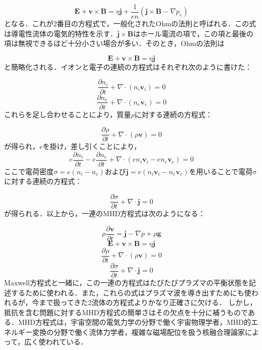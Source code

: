 \documentclass{ltjsarticle}
\numberwithin{equation}{section} %
\begin{document}
\begin{equation}
  \bm{E} + \bm{v} \times \bm{B} = \eta \bm{j} + \frac{1}{en}(\bm{j}\times \bm{B} - \nabla p_e) \label{5.90}
\end{equation}
となる．これが2番目の方程式で，一般化されたOhmの法則と呼ばれる．この式は導電性流体の電気的特性を示す．$\bm{j}\times \bm{B}$はホール電流の項で，この項と最後の項は無視できるほど十分小さい場合が多い．そのとき，Ohmの法則は

\begin{equation}
  \bm{E} + \bm{v}\times \bm{B} = \eta \bm{j} \label{5.91}
\end{equation}
と簡略化される．イオンと電子の連続の方程式はそれぞれ次のように書けた：

\[
  \frac{\partial n_i}{\partial t} + \nabla \cdot (n_i\bm{v}_i) =0
\]
\[
  \frac{\partial n_e}{\partial t} + \nabla \cdot (n_e\bm{v}_e) =0
\]
これらを足し合わせることにより，質量$\rho$に対する連続の方程式：

\[
  \frac{\partial \rho}{\partial t} + \nabla \cdot (\rho \bm{v}) = 0
\]
が得られ，$e$を掛け，差し引くことにより，
\[
  e\frac{\partial n_i}{\partial t} - e\frac{\partial n_e}{\partial t} + \nabla \cdot (en_i\bm{v}_i - en_e\bm{v}_e) = 0
\]
ここで電荷密度$\sigma = e(n_i - n_e)$および$\bm{j} =e(n_i\bm{v}_i - n_e\bm{v}_e)$を用いることで電荷$\sigma$に対する連続の方程式：

\[
  \frac{\partial \sigma}{\partial t} + \nabla\cdot \bm{j} = 0 
\]
が得られる．以上から，一連のMHD方程式は次のようになる：

\begin{equation}
  \rho\frac{\partial \bm{v}}{\partial t} = \bm{j} - \nabla p + \rho \bm{g} \label{5.85.9}
\end{equation}
\begin{equation}
  \bm{E} + \bm{v}\times \bm{B} = \eta \bm{j} \label{5.91.9}
\end{equation}
\begin{equation}
  \frac{\partial \rho}{\partial t} + \nabla \cdot (\rho \bm{v}) = 0 \label{5.92}
\end{equation}
\begin{equation}
  \frac{\partial \sigma}{\partial t} + \nabla\cdot \bm{j} = 0 \label{5.93}
\end{equation}
Maxwell方程式と一緒に，この一連の方程式はたびたびプラズマの平衡状態を記述するために使われる．また，これらの式はプラズマ波を導き出すためにも使われるが，今まで扱ってきた2流体の方程式よりかなり正確さに欠ける．
しかし，抵抗を含む問題に対するMHD方程式の簡単さはその欠点を十分に補うものである．MHD方程式は，宇宙空間の電気力学の分野で働く宇宙物理学者，MHD的エネルギー変換の分野で働く流体力学者，複雑な磁場配位を扱う核融合理論家によって，広く使われている．
\end{document}
